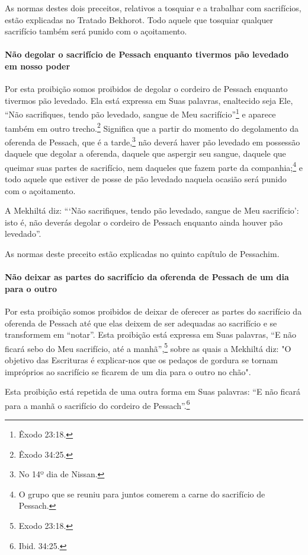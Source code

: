 As normas destes dois preceitos, relativos a tosquiar e a trabalhar com
sacrifícios, estão explicadas no Tratado Bekhorot. Todo aquele que
tosquiar qualquer sacrifício também será punido com o açoitamento.

\paragraph{Não degolar o sacrifício de Pessach enquanto tivermos pão
levedado em nosso poder}

Por esta proibição somos proibidos de degolar o cordeiro de Pessach
enquanto tivermos pão levedado. Ela está expressa em Suas palavras,
enaltecido seja Ele, ``Não sacrifiques, tendo pão levedado, sangue de
Meu sacrifício''\footnote{Êxodo 23:18.} e aparece também em outro
trecho.\footnote{Êxodo 34:25.} Significa que a partir do momento do
degolamento da oferenda de Pessach, que é a
tarde,\footnote{No 14º dia de Nissan.} não deverá haver pão levedado em possessão
daquele que degolar a oferenda, daquele que aspergir seu sangue, daquele
que queimar suas partes de sacrifício, nem daqueles que fazem parte da
companhia;\footnote{O grupo que se reuniu para juntos comerem a carne do sacrifício de
  Pessach.} e todo aquele que estiver de posse de
pão levedado naquela ocasião será punido com o açoitamento.

A Mekhiltá diz: ```Não sacrifiques, tendo pão levedado, sangue de Meu
sacrifício': isto é, não deverás degolar o cordeiro de Pessach
enquanto ainda houver pão levedado''.

As normas deste preceito estão explicadas no quinto capítulo de
Pessachim.

\paragraph{Não deixar as partes do sacrifício da oferenda de Pessach de um dia
para o outro}

Por esta proibição somos proibidos de deixar de oferecer as partes do
sacrifício da oferenda de Pessach até que elas deixem de ser
adequadas ao sacrifício e se transformem em ``notar''. Esta proibição
está expressa em Suas palavras, ``E não ficará sebo do Meu sacrifício,
até a manhã'',\footnote{Exodo 23:18.} sobre as quais a Mekhiltá diz: "O objetivo
das Escrituras é explicar-nos que os pedaços de gordura se tornam
impróprios ao sacrifício se ficarem de um dia para o outro no chão".

Esta proibição está repetida de uma outra forma em Suas palavras: ``E
não ficará para a manhã o sacrifício do cordeiro de Pessach''.\footnote{Ibid.
34:25.}

